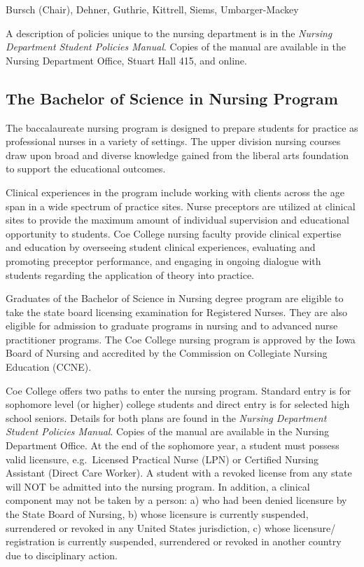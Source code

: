\documentclass[
  letterpaper,
]{scrbook}
\begin{document}
Bursch (Chair), Dehner, Guthrie, Kittrell, Siems, Umbarger-Mackey

A description of policies unique to the nursing department is in the
\emph{Nursing Department Student Policies Manual}. Copies of the manual
are available in the Nursing Department Office, Stuart Hall 415, and
online.

\subsection{The Bachelor of Science in Nursing
Program}\label{the-bachelor-of-science-in-nursing-program}

The baccalaureate nursing program is designed to prepare students for
practice as professional nurses in a variety of settings. The upper
division nursing courses draw upon broad and diverse knowledge gained
from the liberal arts foundation to support the educational outcomes.

Clinical experiences in the program include working with clients across
the age span in a wide spectrum of practice sites. Nurse preceptors are
utilized at clinical sites to provide the maximum amount of individual
supervision and educational opportunity to students. Coe College nursing
faculty provide clinical expertise and education by overseeing student
clinical experiences, evaluating and promoting preceptor performance,
and engaging in ongoing dialogue with students regarding the application
of theory into practice.

Graduates of the Bachelor of Science in Nursing degree program are
eligible to take the state board licensing examination for Registered
Nurses. They are also eligible for admission to graduate programs in
nursing and to advanced nurse practitioner programs. The Coe College
nursing program is approved by the Iowa Board of Nursing and accredited
by the Commission on Collegiate Nursing Education (CCNE).

Coe College offers two paths to enter the nursing program. Standard
entry is for sophomore level (or higher) college students and direct
entry is for selected high school seniors. Details for both plans are
found in the \emph{Nursing Department Student Policies Manual}. Copies
of the manual are available in the Nursing Department Office. At the end
of the sophomore year, a student must possess valid licensure,
e.g.~Licensed Practical Nurse (LPN) or Certified Nursing Assistant
(Direct Care Worker). A student with a revoked license from any state
will NOT be admitted into the nursing program. In addition, a clinical
component may not be taken by a person: a) who had been denied licensure
by the State Board of Nursing, b) whose licensure is currently
suspended, surrendered or revoked in any United States jurisdiction, c)
whose licensure/ registration is currently suspended, surrendered or
revoked in another country due to disciplinary action.
\end{document}
